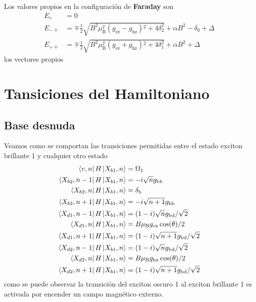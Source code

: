 \documentclass[main.tex]{subfiles}
\begin{document}
Los valores propios en la configuración de \textbf{Faraday} son
\begin{align*}
    E_v &= 0\\
    E_{-\mp} &= \mp\frac{1}{2} \sqrt{B^2 \mu _{\text{B}}^2 \left(g_{\text{ez}}-g_{\text{hz}}\right){}^2+4 \delta _2^2}+\alpha  B^2-\delta _0+\Delta\\
    E_{+\mp} &= \mp\frac{1}{2} \sqrt{B^2 \mu _{\text{B}}^2 \left(g_{\text{ez}}+g_{\text{hz}}\right){}^2+4 \delta _1^2}+\alpha  B^2+\Delta
\end{align*}
los vectores propios
\chapter{Tansiciones del Hamiltoniano}
\section{Base desnuda}
Veamos como se comportan las transiciones permitidas entre el estado exciton brillante 1 y cualquier otro estado
\begin{align*}
    \bra{v,n}H\ket{X_{b1},n} &= \Omega_1\\
    \bra{X_{b2},n-1}H\ket{X_{b1},n} &= -i \sqrt{n} g_\text{bb}\\
    \bra{X_{b2},n}H\ket{X_{b1},n} &= \delta_\text{b}\\
    \bra{X_{b2},n+1}H\ket{X_{b1},n} &= -i \sqrt{n+1} g_\text{bb}\\
    \bra{X_{d1},n-1}H\ket{X_{b1},n} &= (1-i)\sqrt{n} g_\text{bd}/\sqrt{2}\\
    \bra{X_{d1},n}H\ket{X_{b1},n} &= B \mu_\text{B} g_\text{ex} \cos(\theta)/2\\
    \bra{X_{d1},n+1}H\ket{X_{b1},n} &= (1-i)\sqrt{n+1}g_\text{bd}/\sqrt{2}\\
    \bra{X_{d2},n-1}H\ket{X_{b1},n} &= (1-i)\sqrt{n} g_\text{bd}/\sqrt{2}\\
    \bra{X_{d2},n}H\ket{X_{b1},n} &= B \mu_\text{B} g_\text{hx} \cos(\theta)/2\\
    \bra{X_{d2},n+1}H\ket{X_{b1},n} &= (1-i)\sqrt{n+1}g_\text{bd}/\sqrt{2}
\end{align*}
como se puede observar la transición del exciton oscuro 1 al exciton brillante 1 es activada por encender un campo magnético externo.
\end{document}
